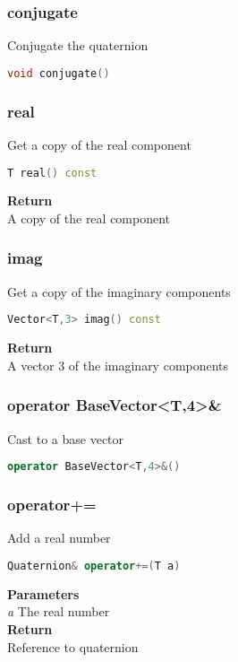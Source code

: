 \subsubsection{conjugate}
\begin{mdframed}
Conjugate the quaternion
\begin{lstlisting}[language=C++]
void conjugate()
\end{lstlisting}
\end{mdframed}

\subsubsection{real}
\begin{mdframed}
Get a copy of the real component
\begin{lstlisting}[language=C++]
T real() const
\end{lstlisting}
\textbf{Return} \\ 
A copy of the real component\\ 
\end{mdframed}

\subsubsection{imag}
\begin{mdframed}
Get a copy of the imaginary components
\begin{lstlisting}[language=C++]
Vector<T,3> imag() const
\end{lstlisting}
\textbf{Return} \\ 
A vector 3 of the imaginary components\\ 
\end{mdframed}

\subsubsection{operator BaseVector<T,4>\&}
\begin{mdframed}
Cast to a base vector
\begin{lstlisting}[language=C++]
operator BaseVector<T,4>&()
\end{lstlisting}
\end{mdframed}

\subsubsection{operator+=}
\begin{mdframed}
Add a real number
\begin{lstlisting}[language=C++]
Quaternion& operator+=(T a)
\end{lstlisting}
\textbf{Parameters} \\ 
\textit{a} The real number \\ 
\textbf{Return} \\ 
Reference to quaternion\\ 
\end{mdframed}

